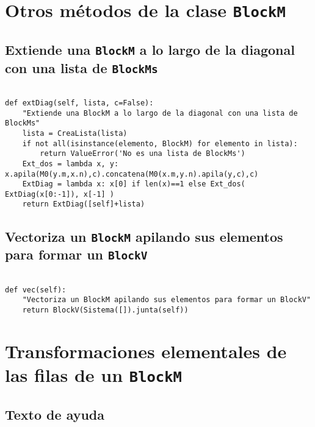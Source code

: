 \documentclass[11pt]{report}
\begin{document}
\section{Otros métodos de la clase \texttt{BlockM}}
\label{sec:org53bcc2d}
\subsection{Extiende una \texttt{BlockM} a lo largo de la diagonal con una lista de \texttt{BlockMs}}
\label{sec:org73953a0}

\begin{verbatim}
   
def extDiag(self, lista, c=False):
    "Extiende una BlockM a lo largo de la diagonal con una lista de BlockMs"
    lista = CreaLista(lista)
    if not all(isinstance(elemento, BlockM) for elemento in lista): 
        return ValueError('No es una lista de BlockMs')
    Ext_dos = lambda x, y: x.apila(M0(y.m,x.n),c).concatena(M0(x.m,y.n).apila(y,c),c)
    ExtDiag = lambda x: x[0] if len(x)==1 else Ext_dos( ExtDiag(x[0:-1]), x[-1] )
    return ExtDiag([self]+lista)

\end{verbatim}

\subsection{Vectoriza un \texttt{BlockM} apilando sus elementos para formar un \texttt{BlockV}}
\label{sec:org806ddc4}
\begin{verbatim}
   
def vec(self):
    "Vectoriza un BlockM apilando sus elementos para formar un BlockV"
    return BlockV(Sistema([]).junta(self))

\end{verbatim}

\section{Transformaciones elementales de las filas de un \texttt{BlockM}}
\label{sec:orgb56aebe}

\subsection{Texto de ayuda}
\label{sec:org5a31f2b}
\end{document}
